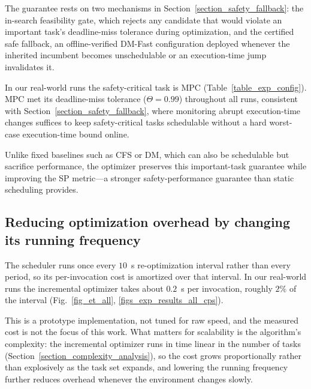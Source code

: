     The guarantee rests on two mechanisms in
    Section~\ref{section_safety_fallback}: the in-search feasibility gate,
    which rejects any candidate that would violate an important task's
    deadline-miss tolerance during optimization, and the certified safe
    fallback, an offline-verified DM-Fast configuration deployed whenever
    the inherited incumbent becomes unschedulable or an execution-time jump
    invalidates it.

    In our real-world runs the safety-critical task is MPC
    (Table~\ref{table_exp_config}).
    MPC met its deadline-miss tolerance ($\Theta = 0.99$) throughout all
    runs, consistent with Section~\ref{section_safety_fallback}, where
    monitoring abrupt execution-time changes suffices to keep
    safety-critical tasks schedulable without a hard worst-case
    execution-time bound online.

    Unlike fixed baselines such as CFS or DM, which can also be schedulable
    but sacrifice performance, the optimizer preserves this important-task
    guarantee while improving the SP metric---a stronger safety-performance
    guarantee than static scheduling provides.



\subsection{Reducing optimization overhead by changing its running frequency}
The scheduler runs once every $10$~s re-optimization interval rather than every
period, so its per-invocation cost is amortized over that interval.
In our real-world runs the incremental optimizer takes about $0.2$~s per
invocation, roughly $2\%$ of the interval
(Fig.~\ref{fig_et_all}, \ref{figs_exp_results_all_cps}).

This is a prototype implementation, not tuned for raw speed, and the measured
cost is not the focus of this work.
What matters for scalability is the algorithm's complexity: the incremental
optimizer runs in time linear in the number of tasks
(Section~\ref{section_complexity_analysis}), so the cost grows proportionally
rather than explosively as the task set expands, and lowering the running
frequency further reduces overhead whenever the environment changes slowly.


